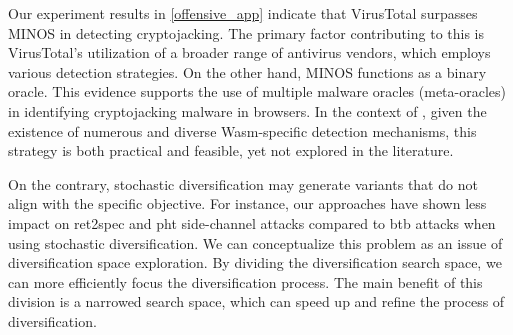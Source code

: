 \begin{strategy}
    \label{meta-oracles}
    Our experiment results in \autoref{offensive_app}  indicate that VirusTotal surpasses MINOS in detecting \Wasm cryptojacking. 
    The primary factor contributing to this is VirusTotal's utilization of a broader range of antivirus vendors, which employs various detection strategies. 
    On the other hand, MINOS functions as a binary oracle. 
    This evidence supports the use of multiple malware oracles (meta-oracles) in identifying cryptojacking malware in browsers. 
    In the context of \Wasm, given the existence of numerous and diverse Wasm-specific detection mechanisms, this strategy is both practical and feasible, yet not explored in the literature.




\end{strategy}





    
    On the contrary, stochastic diversification may generate variants that do not align with the specific objective. 
    For instance, our approaches have shown less impact on ret2spec and pht side-channel attacks compared to btb attacks when using stochastic diversification.
    We can conceptualize this problem as an issue of diversification space exploration. 
    By dividing the diversification search space, we can more efficiently focus the diversification process. 
    The main benefit of this division is a narrowed search space, which can speed up and refine the process of diversification. 
    
